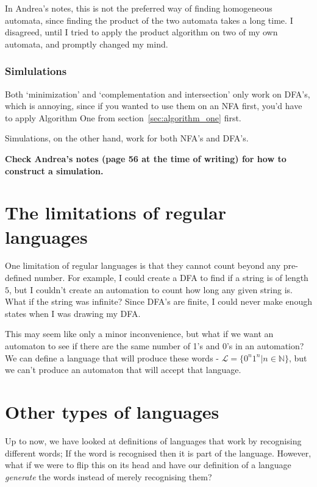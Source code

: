 In Andrea's notes, this is not the preferred way of finding homogeneous
automata, since finding the product of the two automata takes a long time. I
disagreed, until I tried to apply the product algorithm on two of my own
automata, and promptly changed my mind.

\subsubsection{Simlulations}

Both `minimization' and `complementation and intersection' only work on DFA's,
which is annoying, since if you wanted to use them on an NFA first, you'd have
to apply Algorithm One from section~\ref{sec:algorithm_one} first.

Simulations, on the other hand, work for both NFA's and DFA's.

{\bf Check Andrea's notes (page 56 at the time of writing) for how to construct
a simulation.}

\section{The limitations of regular languages}

One limitation of regular languages is that they cannot count beyond any
pre-defined number. For example, I could create a DFA to find if a string is of
length $5$, but I couldn't create an automation to count how long any given
string is. What if the string was infinite? Since DFA's are finite, I could
never make enough states when I was drawing my DFA.

This may seem like only a minor inconvenience, but what if we want an automaton
to see if there are the same number of 1's and 0's in an automation? We can
define a language that will produce these words - $\mathcal{L} = \{0^n1^n|n \in
\mathbb{N}\}$, but we can't produce an automaton that will accept that language.

\section{Other types of languages}
\label{sec:other_languages}

Up to now, we have looked at definitions of languages that work by recognising
different words; If the word is recognised then it is part of the language.
However, what if we were to flip this on its head and have our definition of a
language {\it generate} the words instead of merely recognising them?

